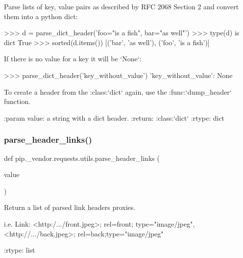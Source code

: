 \begin{DoxyVerb}Parse lists of key, value pairs as described by RFC 2068 Section 2 and
convert them into a python dict:

>>> d = parse_dict_header('foo="is a fish", bar="as well"')
>>> type(d) is dict
True
>>> sorted(d.items())
[('bar', 'as well'), ('foo', 'is a fish')]

If there is no value for a key it will be `None`:

>>> parse_dict_header('key_without_value')
{'key_without_value': None}

To create a header from the :class:`dict` again, use the
:func:`dump_header` function.

:param value: a string with a dict header.
:return: :class:`dict`
:rtype: dict
\end{DoxyVerb}
 \mbox{\label{namespacepip_1_1__vendor_1_1requests_1_1utils_acf7d1a84c806272380c57f2641aea88c}} 
\subsubsection{\texorpdfstring{parse\+\_\+header\+\_\+links()}{parse\_header\_links()}}
{\footnotesize\ttfamily def pip.\+\_\+vendor.\+requests.\+utils.\+parse\+\_\+header\+\_\+links (\begin{DoxyParamCaption}\item[{}]{value }\end{DoxyParamCaption})}

\begin{DoxyVerb}Return a list of parsed link headers proxies.

i.e. Link: <http:/.../front.jpeg>; rel=front; type="image/jpeg",<http://.../back.jpeg>; rel=back;type="image/jpeg"

:rtype: list
\end{DoxyVerb}
 \mbox{\label{namespacepip_1_1__vendor_1_1requests_1_1utils_a05632265e5bbb006cb9ab04b9d5984b1}} 
